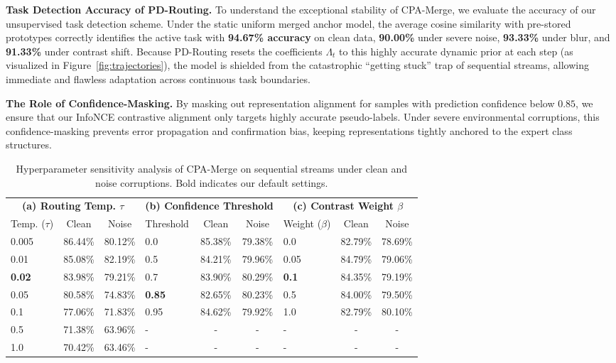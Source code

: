 \documentclass{article}
\theoremstyle{plain}
\theoremstyle{definition}
\theoremstyle{remark}
\begin{document}
\textbf{Task Detection Accuracy of PD-Routing.} To understand the exceptional stability of CPA-Merge, we evaluate the accuracy of our unsupervised task detection scheme. Under the static uniform merged anchor model, the average cosine similarity with pre-stored prototypes correctly identifies the active task with \textbf{94.67\% accuracy} on clean data, \textbf{90.00\%} under severe noise, \textbf{93.33\%} under blur, and \textbf{91.33\%} under contrast shift. Because PD-Routing resets the coefficients $\Lambda_t$ to this highly accurate dynamic prior at each step (as visualized in Figure~\ref{fig:trajectories}), the model is shielded from the catastrophic ``getting stuck'' trap of sequential streams, allowing immediate and flawless adaptation across continuous task boundaries.

\textbf{The Role of Confidence-Masking.} By masking out representation alignment for samples with prediction confidence below $0.85$, we ensure that our InfoNCE contrastive alignment only targets highly accurate pseudo-labels. Under severe environmental corruptions, this confidence-masking prevents error propagation and confirmation bias, keeping representations tightly anchored to the expert class structures.

\begin{table}[t]
\setlength{\tabcolsep}{3.5pt}
\caption{Hyperparameter sensitivity analysis of CPA-Merge on sequential streams under clean and noise corruptions. Bold indicates our default settings.}
\label{tab:sweeps-main}
\vskip 0.15in
\begin{center}
\begin{small}
\begin{sc}
\begin{tabular}{lcc|lcc|lcc}
\toprule
\multicolumn{3}{c|}{\textbf{(a) Routing Temp. $\tau$}} & \multicolumn{3}{c|}{\textbf{(b) Confidence Threshold}} & \multicolumn{3}{c}{\textbf{(c) Contrast Weight $\beta$}} \\
Temp. ($\tau$) & Clean & Noise & Threshold & Clean & Noise & Weight ($\beta$) & Clean & Noise \\
\midrule
0.005 & 86.44\% & 80.12\% & 0.0 & 85.38\% & 79.38\% & 0.0 & 82.79\% & 78.69\% \\
0.01 & 85.08\% & 82.19\% & 0.5 & 84.21\% & 79.96\% & 0.05 & 84.79\% & 79.06\% \\
\textbf{0.02} & 83.98\% & 79.21\% & 0.7 & 83.90\% & 80.29\% & \textbf{0.1} & 84.35\% & 79.19\% \\
0.05 & 80.58\% & 74.83\% & \textbf{0.85} & 82.65\% & 80.23\% & 0.5 & 84.00\% & 79.50\% \\
0.1 & 77.06\% & 71.83\% & 0.95 & 84.62\% & 79.92\% & 1.0 & 82.79\% & 80.10\% \\
0.5 & 71.38\% & 63.96\% & - & - & - & - & - & - \\
1.0 & 70.42\% & 63.46\% & - & - & - & - & - & - \\
\bottomrule
\end{tabular}
\end{sc}
\end{small}
\end{center}
\vskip -0.1in
\end{table}
\end{document}
